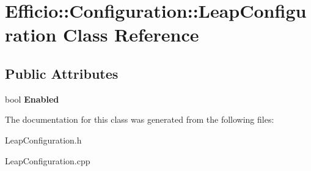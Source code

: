\hypertarget{class_efficio_1_1_configuration_1_1_leap_configuration}{}\section{Efficio\+:\+:Configuration\+:\+:Leap\+Configuration Class Reference}
\label{class_efficio_1_1_configuration_1_1_leap_configuration}
\subsection*{Public Attributes}
\begin{DoxyCompactItemize}
\item 
bool {\bfseries Enabled}\hypertarget{class_efficio_1_1_configuration_1_1_leap_configuration_a237eb567a1666e71d13e93bb2e9d86a9}{}\label{class_efficio_1_1_configuration_1_1_leap_configuration_a237eb567a1666e71d13e93bb2e9d86a9}

\end{DoxyCompactItemize}


The documentation for this class was generated from the following files\+:\begin{DoxyCompactItemize}
\item 
Leap\+Configuration.\+h\item 
Leap\+Configuration.\+cpp\end{DoxyCompactItemize}
